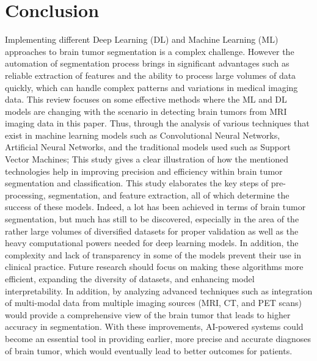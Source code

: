 \documentclass[conference]{IEEEtran}
\begin{document}
\section{Conclusion}
Implementing different Deep Learning (DL) and Machine Learning (ML) approaches to brain tumor segmentation is a complex challenge. However the automation of segmentation process brings in significant advantages such as reliable extraction of features and the ability to process large volumes of data quickly, which can handle complex patterns and variations in medical imaging data.
This review focuses on some effective methods where the ML and DL models are changing with the scenario in detecting brain tumors from MRI imaging data in this paper. Thus, through the analysis of various techniques that exist in machine learning models such as Convolutional Neural Networks, Artificial Neural Networks, and the traditional models used such as Support Vector Machines; This study gives a clear illustration of how the mentioned technologies help in improving precision and efficiency within brain tumor segmentation and classification. This study elaborates the key steps of pre-processing, segmentation, and feature extraction, all of which determine the success of these models. Indeed, a lot has been achieved in terms of brain tumor segmentation, but much has still to be discovered, especially in the area of the rather large volumes of diversified datasets for proper validation as well as the heavy computational powers needed for deep learning models. In addition, the complexity and lack of transparency in some of the models prevent their use in clinical practice. Future research should focus on making these algorithms more efficient, expanding the diversity of datasets, and enhancing model interpretability. In addition, by analyzing advanced techniques such as integration of multi-modal data from multiple imaging sources (MRI, CT, and PET scans) would provide a comprehensive view of the brain tumor that leads to higher accuracy in segmentation. With these improvements, AI-powered systems could become an essential tool in providing earlier, more precise and accurate diagnoses of brain tumor, which would eventually lead to better outcomes for patients.
\end{document}
